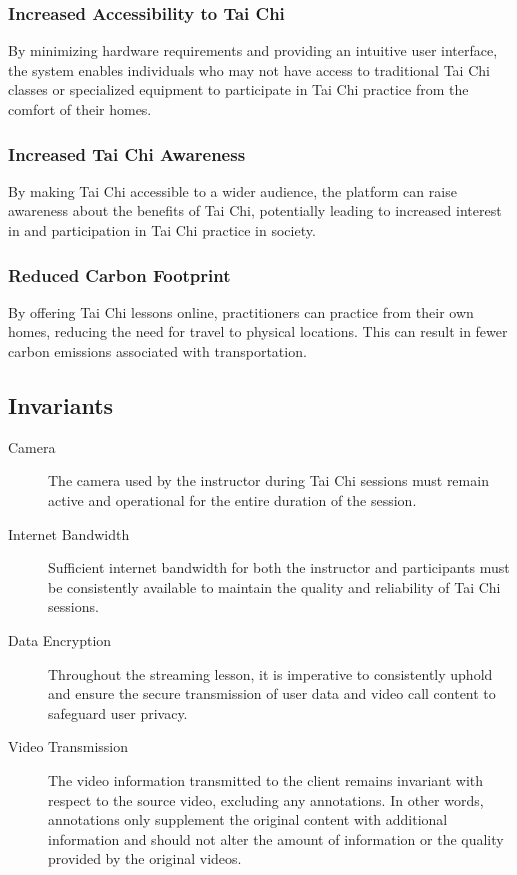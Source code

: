 \documentclass[12pt]{article}
\begin{document}
\subsubsection{Increased Accessibility to Tai Chi}
By minimizing hardware requirements and providing an intuitive user interface, the system enables individuals who may not have access to traditional Tai Chi classes or specialized equipment to participate in Tai Chi practice from the comfort of their homes.
\subsubsection{Increased Tai Chi Awareness}
By making Tai Chi accessible to a wider audience, the platform can raise awareness about the benefits of Tai Chi, potentially leading to increased interest in and participation in Tai Chi practice in society.
\subsubsection{Reduced Carbon Footprint}
By offering Tai Chi lessons online, practitioners can practice from their own homes, reducing the need for travel to physical locations. This can result in fewer carbon emissions associated with transportation.

\subsection{Invariants}
\begin{description}
    \item[Camera] The camera used by the instructor during Tai Chi sessions must remain active and operational for the entire duration of the session.
    \item[Internet Bandwidth] Sufficient internet bandwidth for both the instructor and participants must be consistently available to maintain the quality and reliability of Tai Chi sessions.
    \item[Data Encryption] Throughout the streaming lesson, it is imperative to consistently uphold and ensure the secure transmission of user data and video call content to safeguard user privacy.
    \item[Video Transmission] The video information transmitted to the client remains invariant with respect to the source video, excluding any annotations. In other words, annotations only supplement the original content with additional information and should not alter the amount of information or the quality provided by the original videos.
\end{description}
\end{document}
